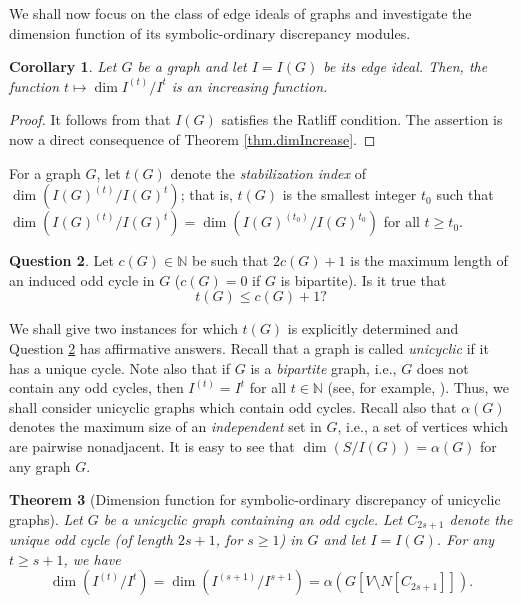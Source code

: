 \documentclass[12pt]{amsart}
\numberwithin{equation}{section}
\newtheorem{theorem}{Theorem}[section]
\newtheorem{corollary}[theorem]{Corollary}
\theoremstyle{definition}
\newtheorem{quest}[theorem]{Question}
\theoremstyle{definition}
\newcommand{\NN}{{\mathbb N}}
\begin{document}
We shall now focus on the class of edge ideals of graphs and investigate the dimension function of its symbolic-ordinary discrepancy modules.


\begin{corollary} \label{dim-graph}
	Let $G$ be a graph and let $I = I(G)$ be its edge ideal. Then, the function $t \mapsto \dim I^{(t)}/I^t$ is an increasing function.
\end{corollary}

\begin{proof}
	It follows from \cite[Lemma 2.12]{MV2012} that $I(G)$ satisfies the Ratliff condition. The assertion is now a direct consequence of Theorem \ref{thm.dimIncrease}.
\end{proof}

For a graph $G$, let $t(G)$ denote the \emph{stabilization index} of $\dim (I(G)^{(t)}/I(G)^t)$; that is, $t(G)$ is the smallest integer $t_0$ such that $\dim (I(G)^{(t)}/I(G)^t) = \dim(I(G)^{(t_0)}/I(G)^{t_0})$ for all $t \ge t_0$. 

\begin{quest}\label{quest.stability}
	Let $c(G) \in \NN$ be such that $2c(G)+1$ is the maximum length of an induced odd cycle in $G$ ($c(G) = 0$ if $G$ is bipartite). Is it true that 
	$$t(G) \le c(G)+1?$$
\end{quest}

We shall give two instances for which $t(G)$ is explicitly determined and Question \ref{quest.stability} has affirmative answers. Recall that a graph is called \emph{unicyclic} if it has a unique cycle. Note also that if $G$ is a \emph{bipartite} graph, i.e., $G$ does not contain any odd cycles, then $I^{(t)} = I^t$ for all $t \in \NN$ (see, for example, \cite{HM2010, SVV1994}). Thus, we shall consider unicyclic graphs which contain odd cycles. Recall also that $\alpha(G)$ denotes the maximum size of an \emph{independent} set in $G$, i.e., a set of vertices which are pairwise nonadjacent. It is easy to see that $\dim(S/I(G)) = \alpha(G)$ for any graph $G$.

\begin{theorem}[Dimension function for symbolic-ordinary discrepancy of unicyclic graphs] \label{thm.unicyclic} Let $G$ be a unicyclic graph containing an odd cycle. Let $C_{2s+1}$ denote the unique odd cycle (of length $2s+1$, for $s \ge 1$) in $G$ and let $I = I(G)$. For any $t \ge s+1$, we have 
	$$\dim(I^{(t)}/I^{t})=\dim(I^{(s+1)}/I^{s+1})=\alpha(G[V\setminus N[C_{2s+1}]]).$$
\end{theorem}
\end{document}
